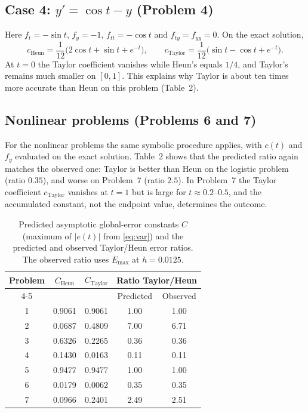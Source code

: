 \documentclass[10pt,letterpaper]{article}
\begin{document}
\subsection{Case 4: $y'=\cos t-y$ (Problem 4)}
Here $f_t=-\sin t$, $f_y=-1$, $f_{tt}=-\cos t$ and $f_{ty}=f_{yy}=0$. On the exact solution,
\begin{equation}
c_{\text{Heun}}=\frac{1}{12}\big(2\cos t+\sin t+e^{-t}\big),\qquad c_{\text{Taylor}}=\frac{1}{12}\big(\sin t-\cos t+e^{-t}\big).
\end{equation}
At $t=0$ the Taylor coefficient vanishes while Heun's equals $1/4$, and Taylor's remains much smaller on $[0,1]$. This explains why Taylor is about ten times more accurate than Heun on this problem (Table~2).

\subsection{Nonlinear problems (Problems 6 and 7)}
For the nonlinear problems the same symbolic procedure applies, with $c(t)$ and $f_y$ evaluated on the exact solution. Table~2 shows that the predicted ratio again matches the observed one: Taylor is better than Heun on the logistic problem (ratio $0.35$), and worse on Problem~7 (ratio $2.5$). In Problem~7 the Taylor coefficient $c_{\text{Taylor}}$ vanishes at $t=1$ but is large for $t\approx0.2$--$0.5$, and the accumulated constant, not the endpoint value, determines the outcome.

\begin{table}[H]\centering
\caption{Predicted asymptotic global-error constants $C$ (maximum of $|e(t)|$ from \eqref{eq:var}) and the predicted and observed Taylor/Heun error ratios. The observed ratio uses $E_{\max}$ at $h=0.0125$.}
\begin{tabular}{@{}ccccc@{}}\toprule
Problem & $C_{\text{Heun}}$ & $C_{\text{Taylor}}$ & \multicolumn{2}{c}{Ratio Taylor/Heun} \\
\cmidrule(lr){4-5}
 & & & Predicted & Observed\\\midrule
1 & 0.9061 & 0.9061 & 1.00 & 1.00 \\
2 & 0.0687 & 0.4809 & 7.00 & 6.71 \\
3 & 0.6326 & 0.2265 & 0.36 & 0.36 \\
4 & 0.1430 & 0.0163 & 0.11 & 0.11 \\
5 & 0.9477 & 0.9477 & 1.00 & 1.00 \\
6 & 0.0179 & 0.0062 & 0.35 & 0.35 \\
7 & 0.0966 & 0.2401 & 2.49 & 2.51\\
\bottomrule\end{tabular}
\end{table}
\end{document}
